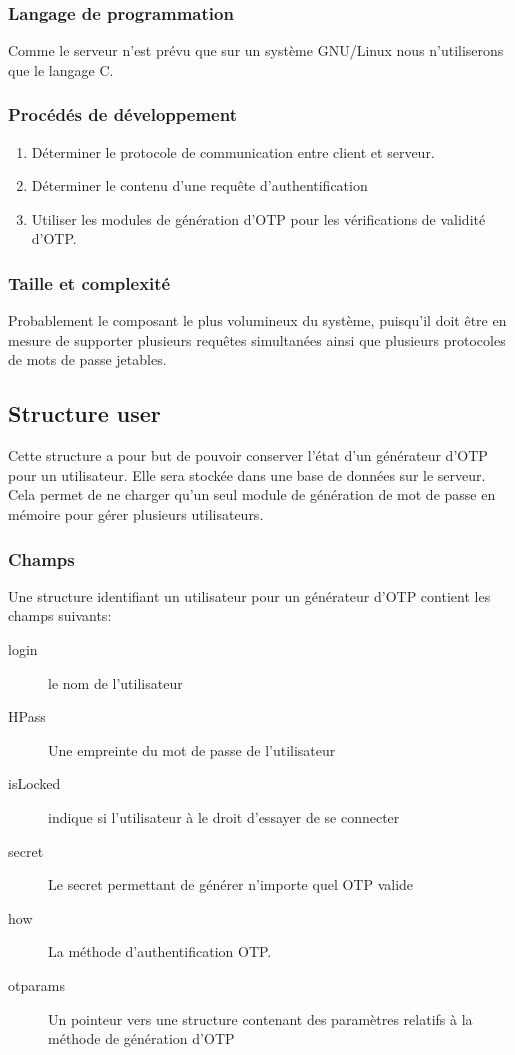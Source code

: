 \documentclass{"../../res/univ-projet"}
\begin{document}
    \subsubsection{Langage de programmation}
        Comme le serveur n'est prévu que sur un système GNU/Linux nous n'utiliserons
    que le langage C.
    
    \subsubsection{Procédés de développement}
    \begin{enumerate}
        \item Déterminer le protocole de communication entre client et serveur.
        \item Déterminer le contenu d'une requête d'authentification
        \item Utiliser les modules de génération d'OTP pour les vérifications de
        validité d'OTP.
    \end{enumerate}        

    \subsubsection{Taille et complexité}
    Probablement le composant le plus volumineux du système, puisqu'il doit être
    en mesure de supporter plusieurs requêtes simultanées ainsi que plusieurs
    protocoles de mots de passe jetables.

\subsection{Structure user}
\label{sub:Structure_user}
    Cette structure a pour but de pouvoir conserver l'état d'un générateur d'OTP
    pour un utilisateur. Elle sera stockée dans une base de données sur le
    serveur. Cela permet de ne charger qu'un seul module de génération de mot de
    passe en mémoire pour gérer plusieurs utilisateurs.
    \subsubsection{Champs}
    \label{ssub:Champs}
        Une structure identifiant un utilisateur pour un générateur d'OTP 
        contient les champs suivants:
        \begin{description}
            \item[login] le nom de l'utilisateur
            \item[HPass] Une empreinte du mot de passe de l'utilisateur
            \item[isLocked] indique si l'utilisateur à le droit d'essayer de
                se connecter
            \item[secret] Le secret permettant de générer n'importe quel OTP 
                valide
            \item[how] La méthode d'authentification OTP.
            \item[otparams] Un pointeur vers une structure contenant des 
                paramètres relatifs à la méthode de génération d'OTP
        \end{description}
\end{document}

